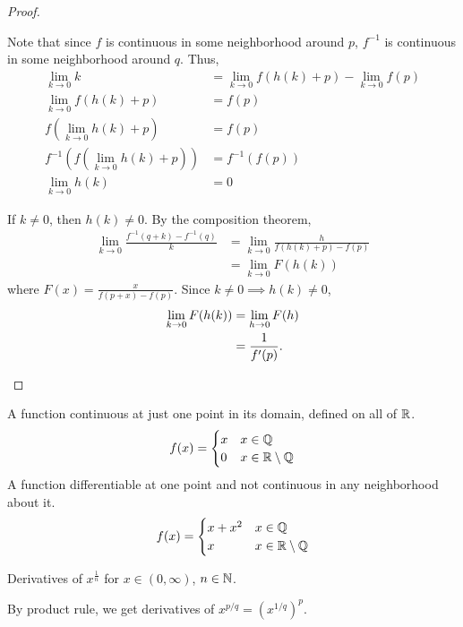 \begin{proof}
\begin{enumerate}[label=(\roman*)]
        Note that since $f$ is continuous in some neighborhood around $p$, $f^{-1}$ is continuous in some neighborhood around $q$.
        Thus, \begin{align*}
            \lim_{k \to 0} k &= \lim_{k \to 0} f(h(k) + p) - \lim_{k \to 0} f(p) \\
            \lim_{k \to 0} f(h(k) + p) &= f(p) \\
            f(\lim_{k \to 0} h(k) + p) &= f(p) \\
            f^{-1}(f(\lim_{k \to 0} h(k) + p)) &= f^{-1}(f(p)) \\
            \lim_{k \to 0} h(k) &= 0
        \end{align*}

        If $k \neq 0$, then $h(k) \neq 0$.
        By the composition theorem,
        \begin{align*}
            \lim_{k \to 0} \frac{f^{-1}(q + k) - f^{-1}(q)}{k} &= \lim_{k \to 0} \frac{h}{f(h(k) + p) - f(p)} \\
            &= \lim_{k \to 0} F(h(k))
        \end{align*}
        where $F(x) = \frac{x}{f(p + x) - f(p)}$.
        Since $k \neq 0 \implies h(k) \neq 0$,
        \begin{align*}
            \lim_{k \to 0} F(h(k)) &= \lim_{h \to 0} F(h) \\
            &= \frac{1}{f'(p)}. \qedhere
        \end{align*}
    \end{enumerate}
\end{proof}

\begin{example}
    A function continuous at just one point in its domain, defined on all of $\mathbb{R}$. \[
        f(x) = \begin{cases}
            x & x \in \mathbb{Q} \\
            0 & x \in \mathbb{R} \setminus \mathbb{Q}
        \end{cases}
    \]
    A function differentiable at one point and not continuous in any neighborhood about it. \[
        f(x) = \begin{cases}
            x + x^{2} & x \in \mathbb{Q} \\
            x & x \in \mathbb{R} \setminus \mathbb{Q}
        \end{cases}
    \]
\end{example}

\begin{example}
    Derivatives of $x^{\frac{1}{n}}$ for $x \in (0, \infty)$, $n \in \mathbb{N}$.

    By product rule, we get derivatives of $x^{p/q} = (x^{1 / q})^{p}$.
\end{example}
